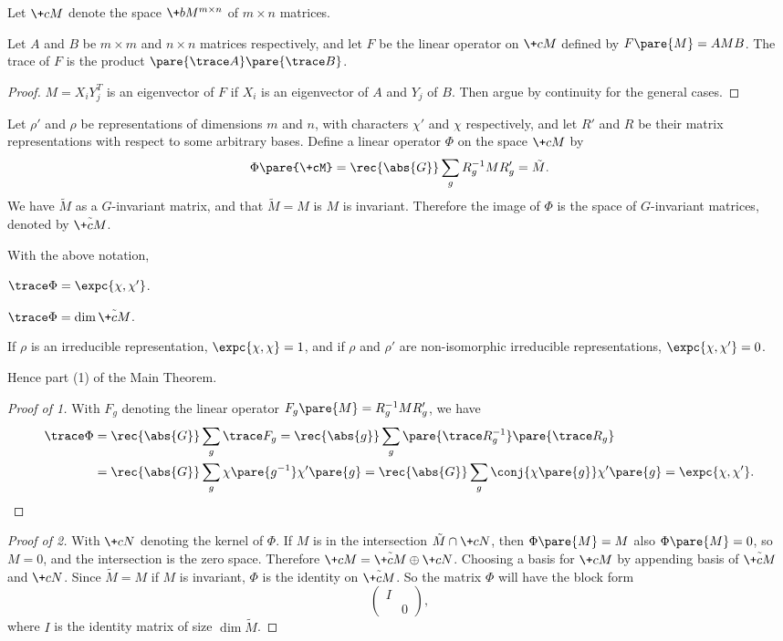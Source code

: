 \documentclass[hidelinks]{article}
\begin{document}
Let $\+cM$ denote the space $\+bM^{m\times n}$ of $m\times n$ matrices.
\begin{lemma}
    Let $A$ and $B$ be $m\times m$ and $n\times n$ matrices respectively, and let $F$ be the linear operator on $\+cM$ defined by $F\pare{M} = AMB$. The trace of $F$ is the product $\pare{\trace A}\pare{\trace B}$.
\end{lemma}
\begin{proof}
    $M = X_i Y_j^T$ is an eigenvector of $F$ if $X_i$ is an eigenvector of $A$ and $Y_j$ of $B$. Then argue by continuity for the general cases.
\end{proof}
Let $\rho'$ and $\rho$ be representations of dimensions $m$ and $n$, with characters $\chi'$ and $\chi$ respectively, and let $R'$ and $R$ be their matrix representations with respect to some arbitrary bases. Define a linear operator $\Phi$ on the space $\+cM$ by
\[ \Phi\pare{\+cM} = \rec{\abs{G}} \sum_g R_g^{-1}MR'_g = \tilde{M}. \]
We have $\tilde{M}$ as a $G$-invariant matrix, and that $\tilde{M} = M$ is $M$ is invariant. Therefore the image of $\Phi$ is the space of $G$-invariant matrices, denoted by $\tilde{\+cM}$.
\begin{lemma}
    With the above notation,
    \begin{cenum}
        \item $\trace \Phi = \expc{\chi,\chi'}$.
        \item $\trace \Phi = \dim \tilde{\+cM}$.
        \item If $\rho$ is an irreducible representation, $\expc{\chi,\chi} = 1$, and if $\rho$ and $\rho'$ are non-isomorphic irreducible representations, $\expc{\chi,\chi'} = 0$.
    \end{cenum}
\end{lemma}
Hence part (1) of the Main Theorem.
\begin{proof}[Proof of 1]
    With $F_g$ denoting the linear operator $F_g\pare{M} = R_g^{-1}MR'_g$, we have
    \begin{align*}
        \trace \Phi &= \rec{\abs{G}}\sum_g \trace F_g = \rec{\abs{g}}\sum_g \pare{\trace R_g^{-1}}\pare{\trace R_g} \\
        &= \rec{\abs{G}}\sum_g \chi\pare{g^{-1}}\chi'\pare{g} = \rec{\abs{G}}\sum_g \conj{\chi\pare{g}}\chi'\pare{g} = \expc{\chi,\chi'}. \qedhere
    \end{align*}
\end{proof}
\begin{proof}[Proof of 2]
    With $\+cN$ denoting the kernel of $\Phi$. If $M$ is in the intersection $\tilde{M}\cap \+cN$, then $\Phi\pare{M} = M$ also $\Phi\pare{M} = 0$, so $M=0$, and the intersection is the zero space. Therefore $\+cM = \tilde{\+cM}\oplus \+cN$. Choosing a basis for $\+cM$ by appending basis of $\tilde{\+cM}$ and $\+cN$. Since $\tilde{M} = M$ if $M$ is invariant, $\Phi$ is the identity on $\tilde{\+cM}$. So the matrix $\Phi$ will have the block form
    \[ \begin{pmatrix}
        I & \\
        & 0
    \end{pmatrix}, \]
    where $I$ is the identity matrix of size $\dim \tilde{M}$.
\end{proof}
\end{document}
